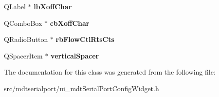\begin{DoxyCompactItemize}
\item 
\hypertarget{class_ui__mdt_serial_port_config_widget_a498de5e4f313a717ae2660cac026e61d}{
QLabel $\ast$ {\bfseries lbXoffChar}}
\label{class_ui__mdt_serial_port_config_widget_a498de5e4f313a717ae2660cac026e61d}

\item 
\hypertarget{class_ui__mdt_serial_port_config_widget_a1fa11aa8b0c9e4a7fcbe9f3506b6a62c}{
QComboBox $\ast$ {\bfseries cbXoffChar}}
\label{class_ui__mdt_serial_port_config_widget_a1fa11aa8b0c9e4a7fcbe9f3506b6a62c}

\item 
\hypertarget{class_ui__mdt_serial_port_config_widget_a51dd5f1afb25436fa0a7dc2c867fe316}{
QRadioButton $\ast$ {\bfseries rbFlowCtlRtsCts}}
\label{class_ui__mdt_serial_port_config_widget_a51dd5f1afb25436fa0a7dc2c867fe316}

\item 
\hypertarget{class_ui__mdt_serial_port_config_widget_a8f344fc14811cf144465a9185c865490}{
QSpacerItem $\ast$ {\bfseries verticalSpacer}}
\label{class_ui__mdt_serial_port_config_widget_a8f344fc14811cf144465a9185c865490}

\end{DoxyCompactItemize}


The documentation for this class was generated from the following file:\begin{DoxyCompactItemize}
\item 
src/mdtserialport/ui\_\-mdtSerialPortConfigWidget.h\end{DoxyCompactItemize}
